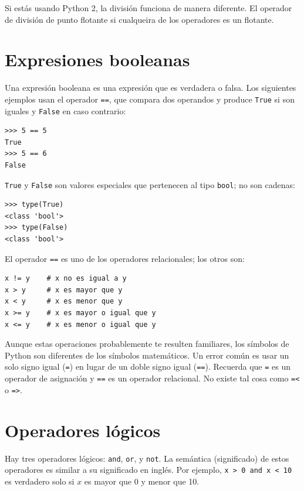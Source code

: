 Si estás usando Python 2, la división  funciona de manera diferente. El operador de división de punto flotante si cualqueira de los operadores es un flotante.

\section{Expresiones booleanas}

Una expresión booleana es una expresión que es verdadera o falsa. Los siguientes ejemplos usan el operador \texttt{==}, que compara dos operandos y produce \texttt{True} si son iguales y \texttt{False} en caso contrario:

\begin{lstlisting}
>>> 5 == 5
True
>>> 5 == 6
False
\end{lstlisting}

\texttt{True} y \texttt{False} son valores especiales que pertenecen al tipo \texttt{bool}; no son cadenas:

\begin{lstlisting}
>>> type(True)
<class 'bool'>
>>> type(False)
<class 'bool'>
\end{lstlisting}

El operador \texttt{==} es uno de los operadores relacionales; los otros son:

\begin{lstlisting}
x != y    # x no es igual a y
x > y     # x es mayor que y
x < y     # x es menor que y
x >= y    # x es mayor o igual que y
x <= y    # x es menor o igual que y
\end{lstlisting}

Aunque estas operaciones probablemente te resulten familiares, los símbolos de Python son diferentes de los símbolos matemáticos. Un error común es usar un solo signo igual (\texttt{=}) en lugar de un doble signo igual (\texttt{==}). Recuerda que \texttt{=} es un operador de asignación y \texttt{==} es un operador relacional. No existe tal cosa como \texttt{=<} o \texttt{=>}.

\section{Operadores lógicos}

Hay tres operadores lógicos: \texttt{and}, \texttt{or}, y \texttt{not}. La semántica (significado) de estos operadores es similar a su significado en inglés. Por ejemplo, \texttt{x > 0 and x < 10} es verdadero solo si $x$ es mayor que 0 y menor que 10.

